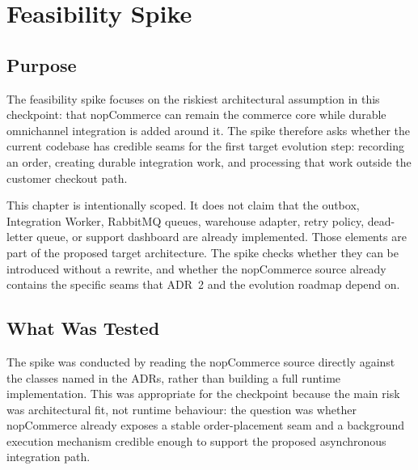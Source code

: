 \chapter{Feasibility Spike}

\section{Purpose}

The feasibility spike focuses on the riskiest architectural assumption in this checkpoint: that
nopCommerce can remain the commerce core while durable omnichannel integration is added around
it. The spike therefore asks whether the current codebase has credible seams for the first
target evolution step: recording an order, creating durable integration work, and processing
that work outside the customer checkout path.

This chapter is intentionally scoped. It does not claim that the outbox, Integration Worker,
RabbitMQ queues, warehouse adapter, retry policy, dead-letter queue, or support dashboard are
already implemented. Those elements are part of the proposed target architecture. The spike
checks whether they can be introduced without a rewrite, and whether the nopCommerce source
already contains the specific seams that ADR~2 and the evolution roadmap depend on.

\section{What Was Tested}

The spike was conducted by reading the nopCommerce source directly against the classes named
in the ADRs, rather than building a full runtime implementation. This was appropriate for the
checkpoint because the main risk was architectural fit, not runtime behaviour: the question was
whether nopCommerce already exposes a stable order-placement seam and a background execution
mechanism credible enough to support the proposed asynchronous integration path.

